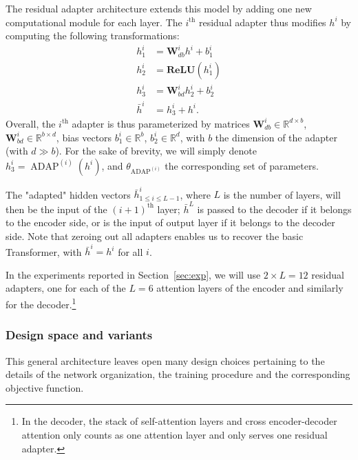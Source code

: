 \documentclass[11pt,a4paper]{article}
\newcommand{\fyTodo}[1]{\Todo[FY:]{\textcolor{orange}{#1}}}
\newcommand{\fyDone}[1]{\done[FY]\Todo[FY:]{\textcolor{orange}{#1}}}
\begin{document}
The residual adapter architecture extends this model by adding one new computational module for each layer. The $i^{\text{th}}$ residual adapter thus modifies $h^i$ by computing the following transformations:\fyDone{Use align env}
\begin{align*}
  h^{i}_1 &= \mathbf{W}_{db}^{i}h^{i} + b^i_{1} \\
  h^{i}_2 &= \mathbf{ReLU}(h_1^{i})
  \\
  h^{i}_3 &= \mathbf{W}_{bd}^{i}h_2^{i} + b^i_{2} \\
  \bar{h}^{i} &= h^{i}_3 + h^i.
\end{align*}
Overall, the  $i^{\text{th}}$ adapter is thus parameterized by matrices $\displaystyle{\mathbf{W}_{db}^{i}\in\mathbb{R}^{d\times b}}$,$\displaystyle{\mathbf{W}_{bd}^{i}\in\mathbb{R}^{b\times d}}$, bias vectors $\displaystyle{b^i_{1} \in \mathbb{R}^{b}}$, $\displaystyle{b^i_{2} \in \mathbb{R}^{d}}$, with $b$ the dimension of the adapter (with $d \gg b$)\fyTodo{Check this}. For the sake of brevity, we will simply denote $h^{i}_3 = \operatorname{ADAP}^{(i)}(h^i)$, and $\theta_{\operatorname{ADAP}^{(i)}}$ the corresponding set of parameters.\fyDone{or is it $h_i$ ?}\fyDone{attention aux matrices $W_i$}

The "adapted" hidden vectors $\bar{h}^i_{ 1\leq i \leq L-1}$, where $L$ is the number of layers, will then be the input of the $(i+1)^{\text{th}}$\fyDone{Self attention ?} layer; $\bar{h}^L$ is passed to the decoder if it belongs to the encoder side, or is the input of output layer if it belongs to the decoder side. Note that zeroing out all adapters enables us to recover the basic Transformer, with $\bar{h}^{i} = h^i$ for all $i$.

In the experiments reported in Section~\ref{sec:exp}, we will use $2\times{}L=12$ residual adapters, one for each of the $L=6$ attention layers of the encoder and similarly for the decoder.\footnote{In the decoder, the stack of self-attention layers and cross encoder-decoder attention only counts as one attention layer and only serves one residual adapter.}

\subsubsection{Design space and variants}
This general architecture leaves open many design choices pertaining to the details of the network organization, the training procedure and the corresponding objective function.
\end{document}
